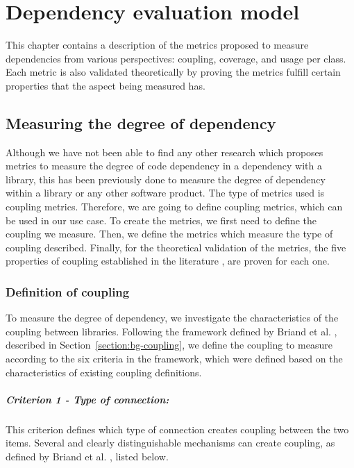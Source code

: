 \chapter{Dependency evaluation model}\label{ch:TheoreticModel}
This chapter contains a description of the metrics proposed to measure dependencies from various perspectives: coupling, coverage, and usage per class. Each metric is also validated theoretically by proving the metrics fulfill certain properties that the aspect being measured has.

\section{Measuring the degree of dependency}\label{sect:degree-dependency}
Although we have not been able to find any other research which proposes metrics to measure the degree of code dependency in a dependency with a library, this has been previously done to measure the degree of dependency within a library or any other software product. The type of metrics used is coupling metrics. Therefore, we are going to define coupling metrics, which can be used in our use case. To create the metrics, we first need to define the coupling we measure. Then, we define the metrics which measure the type of coupling described. Finally, for the theoretical validation of the metrics, the five properties of coupling established in the literature \cite{briand1996property}, are proven for each one.

\subsection{Definition of coupling}\label{subsect:defCoupling}
To measure the degree of dependency, we investigate the characteristics of the coupling between libraries. Following the framework defined by Briand et al. \cite{briand1999unified}, described in Section~\ref{section:bg-coupling}, we define the coupling to measure according to the six criteria in the framework, which were defined based on the characteristics of existing coupling definitions.

\paragraph{Criterion 1 - Type of connection:}
This criterion defines which type of connection creates coupling between the two items. Several and clearly distinguishable mechanisms can create coupling, as defined by Briand et al. \cite{briand1999unified}, listed below.

